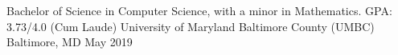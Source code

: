
\begin{cventries}
  \cventry
    {Bachelor of Science in Computer Science, with a minor in Mathematics.  GPA: 3.73/4.0 (Cum Laude)} %
    {University of Maryland Baltimore County (UMBC)} %
    {Baltimore, MD} %
    {May 2019} %
    {
    }
\end{cventries}
